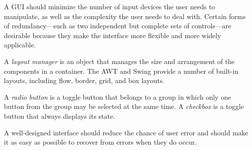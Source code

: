 \begin{SMBL}
\item  A GUI should minimize the number of input devices the user
needs to manipulate, as well as the complexity the user needs
to deal with. Certain forms of redundancy---such as two independent
but complete sets of controls---are desirable because they make
the interface more flexible and more widely applicable.

\item  A {\it layout manager} is an object that manages the size and
arrangement of the components in a container. The AWT and Swing
provide a number of built-in layouts, including flow, border,
grid, and box layouts.

\item  A {\it radio button} is a toggle button that belongs to a group
in which only one button from the group may be selected at the same
time. A {\it checkbox} is a toggle button that always displays its
state.

\item  A well-designed interface should reduce the chance of
user error and should make it as easy as possible to recover from
errors when they do occur.

\end{SMBL}

